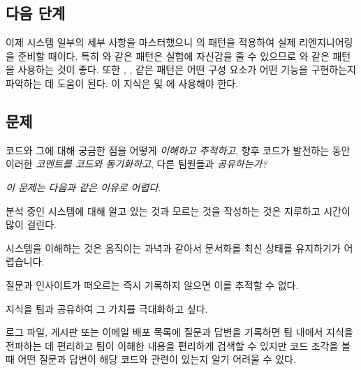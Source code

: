\documentclass[a4paper,10pt,twoside]{book}
\begin{document}
\subsection*{다음 단계}

이제 시스템 일부의 세부 사항을 마스터했으니 의 패턴을 적용하여 실제 리엔지니어링을 준비할 때이다. 특히 와 같은 패턴은 실험에 자신감을 줄 수 있으므로 와 같은 패턴을 사용하는 것이 좋다. 또한 , ,  같은 패턴은 어떤 구성 요소가 어떤 기능을 구현하는지 파악하는 데 도움이 된다. 이 지식은  및 에 사용해야 한다.




\subsection*{문제}

코드와 그에 대해 궁금한 점을 어떻게 \emph{이해하고 추적하고}, 향후 코드가 발전하는 동안 이러한 \emph{코멘트를 코드와 동기화하고}, 다른 팀원들과 \emph{공유하는가?} 

\emph{이 문제는 다음과 같은 이유로 어렵다.}

\begin{bulletlist}
\item 분석 중인 시스템에 대해 알고 있는 것과 모르는 것을 작성하는 것은 지루하고 시간이 많이 걸린다.

\item 시스템을 이해하는 것은 움직이는 과녁과 같아서 문서화를 최신 상태를 유지하기가 어렵습니다.

\item 질문과 인사이트가 떠오르는 즉시 기록하지 않으면 이를 추적할 수 없다.

\item 지식을 팀과 공유하여 그 가치를 극대화하고 싶다.

\item 로그 파일, 게시판 또는 이메일 배포 목록에 질문과 답변을 기록하면 팀 내에서 지식을 전파하는 데 편리하고 팀이 이해한 내용을 편리하게 검색할 수 있지만 코드 조각을 볼 때 어떤 질문과 답변이 해당 코드와 관련이 있는지 알기 어려울 수 있다.
\end{bulletlist}
\end{document}
